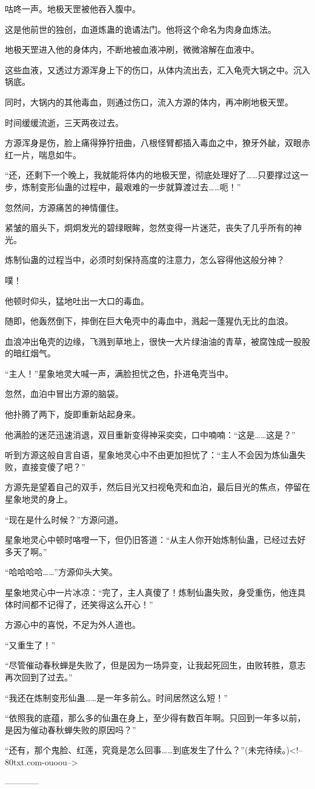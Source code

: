 \begin{this_body}
咕咚一声。地极天罡被他吞入腹中。

这是他前世的独创，血道炼蛊的诡谲法门。他将这个命名为肉身血炼法。

地极天罡进入他的身体内，不断地被血液冲刷，微微溶解在血液中。

这些血液，又透过方源浑身上下的伤口，从体内流出去，汇入龟壳大锅之中。沉入锅底。

同时，大锅内的其他毒血，则通过伤口，流入方源的体内，再冲刷地极天罡。

时间缓缓流逝，三天两夜过去。

方源浑身是伤，脸上痛得狰狞扭曲，八根怪臂都插入毒血之中，獠牙外龇，双眼赤红一片，喘息如牛。

“还，还剩下一个晚上，我就能将体内的地极天罡，彻底处理好了……只要撑过这一步，炼制变形仙蛊的过程中，最艰难的一步就算渡过去……呃！”

忽然间，方源痛苦的神情僵住。

紧皱的眉头下，炯炯发光的碧绿眼眸，忽然变得一片迷茫，丧失了几乎所有的神光。

炼制仙蛊的过程当中，必须时刻保持高度的注意力，怎么容得他这般分神？

噗！

他顿时仰头，猛地吐出一大口的毒血。

随即，他轰然倒下，摔倒在巨大龟壳中的毒血中，溅起一蓬猩仇无比的血浪。

血浪冲出龟壳的边缘，飞溅到草地上，很快一大片绿油油的青草，被腐蚀成一股股的暗红烟气。

“主人！”星象地灵大喊一声，满脸担忧之色，扑进龟壳当中。

忽然，血泊中冒出方源的脑袋。

他扑腾了两下，旋即重新站起身来。

他满脸的迷茫迅速消退，双目重新变得神采奕奕，口中喃喃：“这是……这是？”

听到方源这般自言自语，星象地灵心中不由更加担忧了：“主人不会因为炼仙蛊失败，直接变傻了吧？”

方源先是望着自己的双手，然后目光又扫视龟壳和血泊，最后目光的焦点，停留在星象地灵的身上。

“现在是什么时候？”方源问道。

星象地灵心中顿时咯噔一下，但仍旧答道：“从主人你开始炼制仙蛊，已经过去好多天了啊。”

“哈哈哈哈……”方源仰头大笑。

星象地灵心中一片冰凉：“完了，主人真傻了！炼制仙蛊失败，身受重伤，他连具体时间都不记得了，还笑得这么开心！”

方源心中的喜悦，不足为外人道也。

“又重生了！”

“尽管催动春秋蝉是失败了，但是因为一场异变，让我起死回生，由败转胜，意志再次回到了过去。”

“我还在炼制变形仙蛊……是一年多前么。时间居然这么短！”

“依照我的底蕴，那么多的仙蛊在身上，至少得有数百年啊。只回到一年多以前，是因为催动春秋蝉失败的原因吗？”

“还有，那个鬼脸、红莲，究竟是怎么回事……到底发生了什么？”(未完待续。)<!--80txt.com-ouoou-->

------------

\end{this_body}


